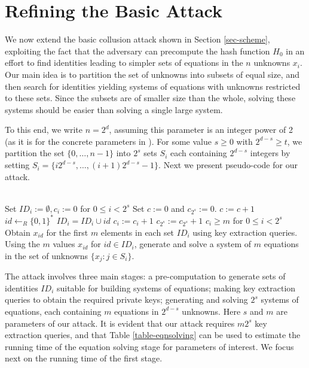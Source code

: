 \documentclass{llncs}
\begin{document}
\section{Refining the Basic Attack}\label{sec-attacks}

We now extend the basic collusion attack shown in Section \ref{sec-scheme},
exploiting the fact that the adversary can precompute the hash function $H_0$
in an effort to find identities leading to simpler sets of equations in the $n$
unknowns $x_i$. Our main idea is to partition the set of unknowns into subsets
of equal size, and
then search for identities yielding systems of equations with unknowns
restricted to these sets. Since the subsets are of
smaller size than the whole, solving these systems should be easier than solving
a single large system.

To this end, we write $n=2^d$, assuming this parameter is an integer power of 2
(as it is for the
concrete parameters in \cite{CCGHC10}). For some value $s \ge 0$ with $2^{d-s} \ge t$,
we partition the set $\{0,\ldots,n-1\}$ into $2^{s}$ sets $S_i$ each containing
$2^{d-s}$ integers by setting
$S_i=\{i2^{d-s},\ldots,(i+1)2^{d-s}-1 \}$. Next we present pseudo-code for our
attack.

\begin{algorithmic}
\STATE \hfill \\
\STATE Set $ID_i :=\emptyset, c_i :=0$ for $0\le i <2^s$
\STATE Set $c:=0$ and $c_{2^s}:=0$.
\REPEAT
    \STATE $c:=c+1$
    \STATE $id \leftarrow_R \{0,1\}^*$
        \STATE $ID_i=ID_i \cup id$
        \STATE $c_i:=c_i+1$
    \ELSE
        \STATE $c_{2^s}:=c_{2^s}+1$
    \ENDIF
\UNTIL $c_i \ge m$ for $0 \le i <2^s$
\STATE Obtain $x_{id}$ for the first $m$ elements in each set $ID_i$ using key
extraction queries.
    \STATE Using the $m$ values $x_{id}$ for $id \in ID_i$, generate and solve a
system of $m$ equations in the set of unknowns $\{ x_j: j \in S_i \}$.
\ENDFOR
\end{algorithmic}

The attack involves three main stages: a pre-computation to generate sets of
identities $ID_i$ suitable for building systems of equations; making key
extraction queries to obtain the required private keys; generating and solving
$2^s$ systems of equations, each containing $m$ equations in $2^{d-s}$
unknowns. Here $s$ and $m$ are parameters of our attack. It is evident that our
attack requires $m2^s$ key extraction queries, and that Table
\ref{table-eqnsolving} can be used to estimate the running time of the equation
solving stage for parameters of interest. We focus next on the running time of
the first stage.
\end{document}
